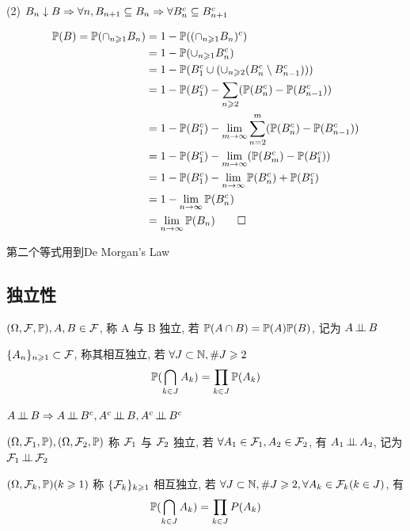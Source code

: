 (2) $B_n\downarrow B\Rightarrow \forall n, B_{n+1}\subseteq B_n \Rightarrow \forall B_n^c\subseteq B_{n+1}^c$

\[
\begin{aligned}
    \mathbb{P}(B) = \mathbb{P}(\cap_{n\geqslant 1}B_n) &= 1-\mathbb{P}((\cap_{n\geqslant 1}B_n)^c)\\
    &=1-\mathbb{P}(\cup_{n\geqslant 1}B_n^c)\\
    &=1-\mathbb{P}(B_1^c\cup (\cup_{n\geqslant 2}(B_n^c\setminus B_{n-1}^c)))\\
    &=1-\mathbb{P}(B_1^c)-\sum_{n\geqslant 2}(\mathbb{P}(B_n^c)-\mathbb{P}(B_{n-1}^c))\\
    &=1-\mathbb{P}(B_1^c)-\lim_{m \to \infty}\sum_{n=2}^m(\mathbb{P}(B_n^c)-\mathbb{P}(B_{n-1}^c))\\
    &=1-\mathbb{P}(B_1^c)-\lim_{m \to \infty}(\mathbb{P}(B_m^c)-\mathbb{P}(B_1^c))\\
    &=1-\mathbb{P}(B_1^c)-\lim_{n \to \infty}\mathbb{P}(B_n^c)+\mathbb{P}(B_1^c)\\
    &=1-\lim_{n \to \infty}\mathbb{P}(B_n^c)\\
    &=\lim_{n \to \infty}\mathbb{P}(B_n)\qed
\end{aligned}
\]

第二个等式用到De Morgan's Law

\newpage
\subsection{独立性}

\begin{definition}[事件间的独立性]
    $(\Omega,\mathcal{F}, \mathbb{P}), A,B\in \mathcal{F}$, 称 A 与 B 独立, 若 $\mathbb{P}(A\cap B)=\mathbb{P}(A)\mathbb{P}(B)$, 记为 $A\operatorname{\perp\!\!\!\perp} B$
\end{definition}

\begin{definition}[事件间的相互独立]
    $\{{A}_{n}\}_{n \geqslant 1} \subset \mathcal{F}$, 称其相互独立, 若 $\forall J\subset \mathbb{N}, \#J\geqslant 2$
    \[
    \mathbb{P}(\bigcap_{k\in J}A_k)=\prod_{k\in J}\mathbb{P}(A_k)
    \]
\end{definition}

\begin{property}\label{prop:counter_indep}
    $A\ind B\Rightarrow A\ind B^c, A^c \ind B, A^c\ind B^c$
\end{property}

\begin{definition}\label{def:sigma_indep}
    $(\Omega, \mathcal{F}_1, \mathbb{P}), (\Omega, \mathcal{F}_2, \mathbb{P})$ 称 $\mathcal{F}_1$ 与 $\mathcal{F}_2$ 独立, 若 $\forall A_1\in \mathcal{F}_1, A_2\in \mathcal{F}_2$, 有 $A_1\operatorname{\perp\!\!\!\perp} A_2$, 记为 $\mathcal{F}_1\operatorname{\perp\!\!\!\perp} \mathcal{F}_2$
\end{definition}

\begin{definition}
    $(\Omega, \mathcal{F}_k, \mathbb{P})(k\geqslant 1)$ 称 $\{{\mathcal{F}}_{k}\}_{k \geqslant 1}$ 相互独立, 若 $\forall J\subset \mathbb{N}, \#J\geqslant 2, \forall A_k\in \mathcal{F}_k(k\in J)$, 有
    \[
    \mathbb{P}(\bigcap_{k\in J}A_k)=\prod_{k\in J}P(A_k)
    \]
\end{definition}

